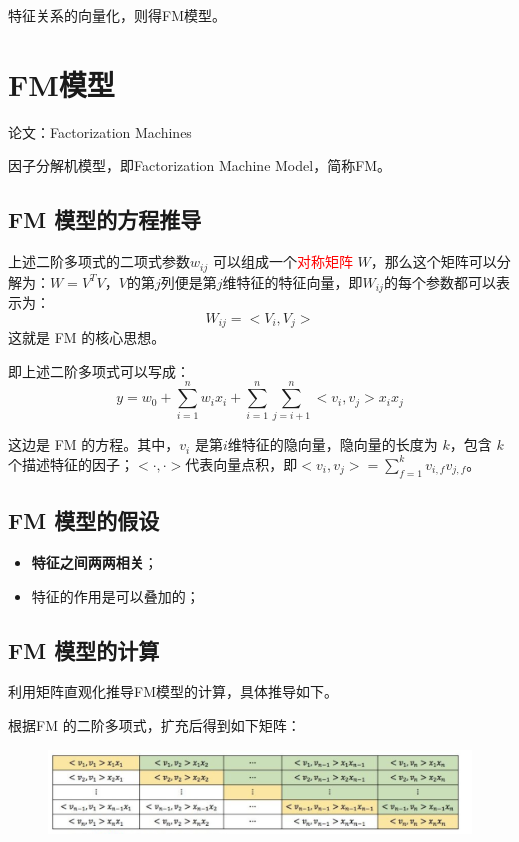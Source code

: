 \documentclass[12pt]{article}
\begin{document}
特征关系的向量化，则得FM模型。

\section{FM模型}
论文：Factorization Machines

因子分解机模型，即Factorization Machine Model，简称FM。

\subsection{FM 模型的方程推导}
上述二阶多项式的二项式参数$w_{ij}$ 可以组成一个\textcolor{red}{对称矩阵} $W$，那么这个矩阵可以分解为：$W = V^TV$，$V$的第$j$列便是第$j$维特征的特征向量，即$W_{ij}$的每个参数都可以表示为：
$$
W_{ij} = < V_i, V_j >
$$
这就是 FM 的核心思想。

即上述二阶多项式可以写成：
$$
y = w_0 + \sum_{i=1}^nw_ix_i + \sum_{i=1}^n\sum_{j=i+1}^n <v_i, v_j > x_ix_j
$$

这边是 FM 的方程。其中，$v_i$ 是第$i$维特征的隐向量，隐向量的长度为 $k$，包含 $k$ 个描述特征的因子；$<\cdot,\cdot>$代表向量点积，即$ < v_i , v_j > = \sum_{f=1}^k v_{i,f}v_{j,f}$。


\subsection{FM 模型的假设}
\begin{itemize}
\setlength{\itemsep}{0pt}
\setlength{\parsep}{0pt}
\setlength{\parskip}{0pt}
    \item \textbf{特征之间两两相关}；
    \item 特征的作用是可以叠加的；
\end{itemize}

\subsection{FM 模型的计算}
利用矩阵直观化推导FM模型的计算，具体推导如下。

根据FM 的二阶多项式，扩充后得到如下矩阵：
\begin{figure}[H]
    \centering
    \includegraphics[width=1\textwidth]{fig/FM_Second_Order_Part_Example.png}
\end{figure}
\end{document}
